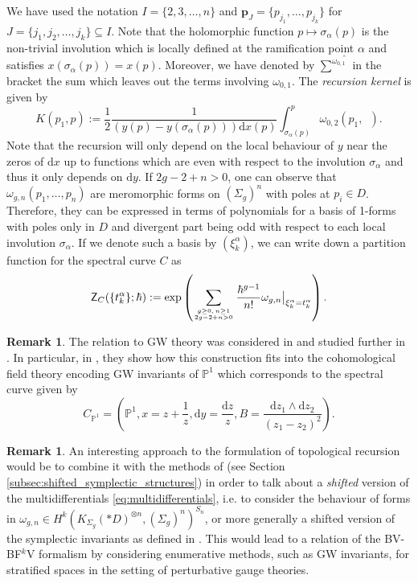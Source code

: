 \documentclass[11pt,colorinlistoftodos]{amsart}
\numberwithin{equation}{subsection}
\theoremstyle{plain}
\theoremstyle{definition}
\newtheorem{rem}[thm]{Remark}
\theoremstyle{remark}
\newcommand{\dd}{{\mathrm{d}}}
\begin{document}
We have used the notation $I=\{2,3,\ldots,n\}$ and $\boldsymbol{p}_J=\{p_{j_1},\ldots,p_{j_k}\}$ for $J=\{j_1,j_2,\ldots,j_k\}\subseteq I$. Note that the holomorphic function $p\mapsto \sigma_\alpha(p)$ is the non-trivial involution which is locally defined at the ramification point $\alpha$ and satisfies $x(\sigma_\alpha(p))=x(p)$. Moreover, we have denoted by $\widehat{\sum^{\omega_{0,1}}}$ in the bracket the sum which leaves out the terms involving $\omega_{0,1}$. The \emph{recursion kernel} is given by
\begin{equation}
    K(p_1,p):=\frac{1}{2}\frac{1}{(y(p)-y(\sigma_\alpha(p)))\dd x(p)}\int_{\sigma_\alpha(p)}^p\omega_{0,2}(p_1,\enspace).
\end{equation}
Note that the recursion will only depend on the local behaviour of $y$ near the zeros of $\dd x$ up to functions which are even with respect to the involution $\sigma_\alpha$ and thus it only depends on $\dd y$. 
If $2g-2+n>0$, one can observe that $\omega_{g,n}(p_1,\ldots, p_n)$ are meromorphic forms on $(\Sigma_g)^n$ with poles at $p_i\in D$. Therefore, they can be expressed in terms of polynomials for a basis of 1-forms with poles only in $D$ and divergent part being odd with respect to each local involution $\sigma_\alpha$. If we denote such a basis by $(\xi^\alpha_k)$, we can write down a partition function for the spectral curve $C$ as 
\begin{equation}
    \label{eq:partition_function_spectral_curve}
    \mathsf{Z}_C(\{t_k^\alpha\};\hbar):=\exp\left(\sum_{g\geq 0,\, n\geq 1\atop 2g-2+n>0}\frac{\hbar^{g-1}}{n!}\omega_{g,n}\big|_{\xi^\alpha_k=t^\alpha_k}\right).
\end{equation}

\begin{rem}
The relation to GW theory was considered in \cite{Dunin-BarkowskiOrantinShadrinSpitz2014} and studied further in \cite{BorotNorbury2019}. In particular, in \cite{Dunin-BarkowskiOrantinShadrinSpitz2014}, they show how this construction fits into the cohomological field theory encoding GW invariants of $\mathbb{P}^1$ which corresponds to the spectral curve given by 
\[
C_{\mathbb{P}^1}=\left(\mathbb{P}^1,x=z+\frac{1}{z},\dd y=\frac{\dd z}{z},B=\frac{\dd z_1\land \dd z_2}{(z_1-z_2)^2}\right).
\]
\end{rem}

\begin{rem}
An interesting approach to the formulation of topological recursion would be to combine it with the methods of \cite{PantevToenVaquieVezzosi2013} (see Section \ref{subsec:shifted_symplectic_structures}) in order to talk about a \emph{shifted} version of the multidifferentials \eqref{eq:multidifferentials}, i.e. to consider the behaviour of forms in $\omega_{g,n}\in H^k(K_{\Sigma_g}(*D)^{\otimes n},(\Sigma_g)^n)^{S_n}$, or more generally a shifted version of the symplectic invariants as defined in \cite{EynardOrantin2009}. This would lead to a relation of the BV-BF$^k$V formalism by considering enumerative methods, such as GW invariants, for stratified spaces in the setting of perturbative gauge theories. 
\end{rem}
\end{document}
